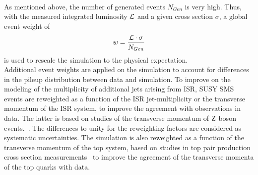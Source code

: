 \\
As mentioned above, the number of generated events $N_{Gen}$ is very high. Thus, with the measured integrated luminosity $\mathcal{L}$  and a given cross section $\sigma$, a global event weight of
\begin{equation}
 w = \frac{\mathcal{L} \cdot \sigma}{N_{Gen}}
\end{equation}
is used to rescale the simulation to the physical expectation.\\
Additional event weights are applied on the simulation to account for differences in the pileup distribution between data and simulation. To improve on the \MADGRAPH modeling of the multiplicity of additional jets arising from ISR, SUSY SMS events are reweighted as a function of the ISR jet-multiplicity or the transverse momentum of the ISR system, to improve the agreement with observations in data.
The latter is based on studies of the transverse momentum of $\mathrm{Z}$ boson events.~\cite{NISRweight}.
The differences to unity for the reweighting factors are considered as systematic uncertainties.
The \POWHEG \ttbar simulation is also reweighted as a function of the transverse momentum of the top system, based on studies in top pair production cross section measurements~\cite{topWeight1,topWeight2,topWeight3,topWeight4} to improve the agreement of the transverse momenta of the top quarks with data.


